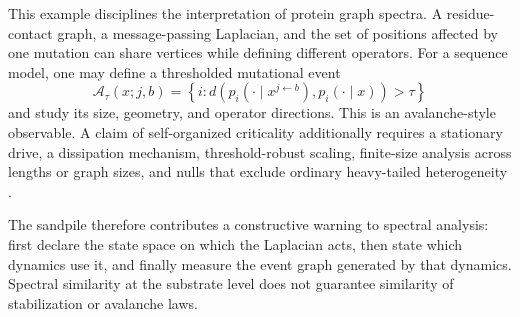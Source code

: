 This example disciplines the interpretation of protein graph spectra.  A residue-contact graph,
a message-passing Laplacian, and the set of positions affected by one mutation can share vertices
while defining different operators.  For a sequence model, one may define a thresholded mutational
event
\begin{equation}
\mathcal A_\tau(x;j,b)
=\left\{i:
d\!\left(p_i(\cdot\mid x^{j\leftarrow b}),p_i(\cdot\mid x)\right)>\tau
\right\}
\label{eq:book-mutational-avalanche}
\end{equation}
and study its size, geometry, and operator directions.  This is an avalanche-style observable.
A claim of self-organized criticality additionally requires a stationary drive, a dissipation
mechanism, threshold-robust scaling, finite-size analysis across lengths or graph sizes, and nulls
that exclude ordinary heavy-tailed heterogeneity \cite{bak1987}.

The sandpile therefore contributes a constructive warning to spectral analysis: first declare
the state space on which the Laplacian acts, then state which dynamics use it, and finally measure
the event graph generated by that dynamics.  Spectral similarity at the substrate level does not
guarantee similarity of stabilization or avalanche laws.
